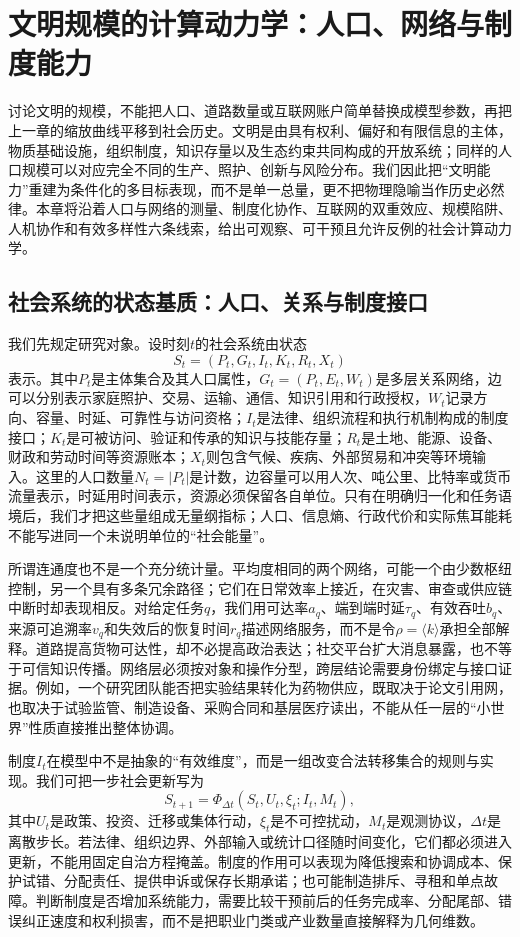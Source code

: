 \chapter{文明规模的计算动力学：人口、网络与制度能力}
\label{chp:civilization_scaling_law}

讨论文明的规模，不能把人口、道路数量或互联网账户简单替换成模型参数，再把上一章的缩放曲线平移到社会历史。文明是由具有权利、偏好和有限信息的主体，物质基础设施，组织制度，知识存量以及生态约束共同构成的开放系统；同样的人口规模可以对应完全不同的生产、照护、创新与风险分布。我们因此把“文明能力”重建为条件化的多目标表现，而不是单一总量，更不把物理隐喻当作历史必然律。本章将沿着人口与网络的测量、制度化协作、互联网的双重效应、规模陷阱、人机协作和有效多样性六条线索，给出可观察、可干预且允许反例的社会计算动力学。

\section{社会系统的状态基质：人口、关系与制度接口}
\label{sec:social_manifold_substrate}

我们先规定研究对象。设时刻$t$的社会系统由状态
\[
S_t=(P_t,G_t,I_t,K_t,R_t,X_t)
\]
表示。其中$P_t$是主体集合及其人口属性，$G_t=(P_t,E_t,W_t)$是多层关系网络，边可以分别表示家庭照护、交易、运输、通信、知识引用和行政授权，$W_t$记录方向、容量、时延、可靠性与访问资格；$I_t$是法律、组织流程和执行机制构成的制度接口；$K_t$是可被访问、验证和传承的知识与技能存量；$R_t$是土地、能源、设备、财政和劳动时间等资源账本；$X_t$则包含气候、疾病、外部贸易和冲突等环境输入。这里的人口数量$N_t=|P_t|$是计数，边容量可以用人次、吨公里、比特率或货币流量表示，时延用时间表示，资源必须保留各自单位。只有在明确归一化和任务语境后，我们才把这些量组成无量纲指标；人口、信息熵、行政代价和实际焦耳能耗不能写进同一个未说明单位的“社会能量”。

所谓连通度也不是一个充分统计量。平均度相同的两个网络，可能一个由少数枢纽控制，另一个具有多条冗余路径；它们在日常效率上接近，在灾害、审查或供应链中断时却表现相反。对给定任务$q$，我们用可达率$a_q$、端到端时延$\tau_q$、有效吞吐$b_q$、来源可追溯率$v_q$和失效后的恢复时间$r_q$描述网络服务，而不是令$\rho=\langle k\rangle$承担全部解释。道路提高货物可达性，却不必提高政治表达；社交平台扩大消息暴露，也不等于可信知识传播。网络层必须按对象和操作分型，跨层结论需要身份绑定与接口证据。例如，一个研究团队能否把实验结果转化为药物供应，既取决于论文引用网，也取决于试验监管、制造设备、采购合同和基层医疗读出，不能从任一层的“小世界”性质直接推出整体协调。

制度$I_t$在模型中不是抽象的“有效维度”，而是一组改变合法转移集合的规则与实现。我们可把一步社会更新写为
\[
S_{t+1}=\Phi_{\Delta t}(S_t,U_t,\xi_t;I_t,M_t),
\]
其中$U_t$是政策、投资、迁移或集体行动，$\xi_t$是不可控扰动，$M_t$是观测协议，$\Delta t$是离散步长。若法律、组织边界、外部输入或统计口径随时间变化，它们都必须进入更新，不能用固定自治方程掩盖。制度的作用可以表现为降低搜索和协调成本、保护试错、分配责任、提供申诉或保存长期承诺；也可能制造排斥、寻租和单点故障。判断制度是否增加系统能力，需要比较干预前后的任务完成率、分配尾部、错误纠正速度和权利损害，而不是把职业门类或产业数量直接解释为几何维数。

